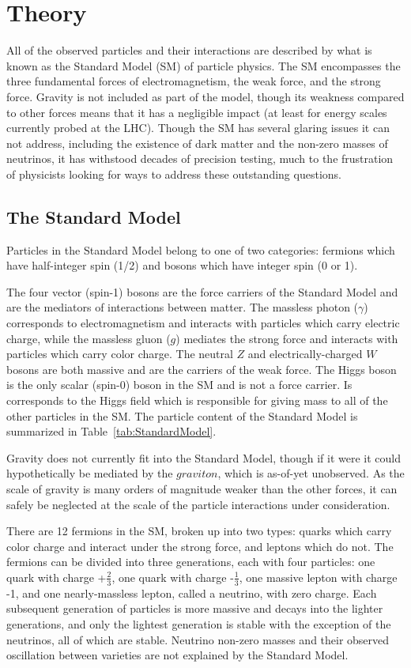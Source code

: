
\chapter{Theory}
\label{ch:Theory}

All of the observed particles and their interactions are described by what is known as the Standard Model (SM) of particle physics.  The SM encompasses the three fundamental forces of electromagnetism, the weak force, and the strong force.  Gravity is not included as part of the model, though its weakness compared to other forces means that it has a negligible impact (at least for energy scales currently probed at the LHC).  Though the SM has several glaring issues it can not address, including the existence of dark matter and the non-zero masses of neutrinos, it has withstood decades of precision testing, much to the frustration of physicists looking for ways to address these outstanding questions.

\section{The Standard Model}
Particles in the Standard Model belong to one of two categories: fermions which have half-integer spin (1/2) and bosons which have integer spin (0 or 1).

The four vector (spin-1) bosons are the force carriers of the Standard Model and are the mediators of interactions between matter.  The massless photon ($\gamma$) corresponds to electromagnetism and interacts with particles which carry electric charge, while the massless gluon ($g$) mediates the strong force and interacts with particles which carry color charge. The neutral $Z$ and electrically-charged $W$ bosons are both massive and are the carriers of the weak force.  The Higgs boson is the only scalar (spin-0) boson in the SM and is not a force carrier.  Is corresponds to the Higgs field which is responsible for giving mass to all of the other particles in the SM.  The particle content of the Standard Model is summarized in Table~\ref{tab:StandardModel}.

Gravity does not currently fit into the Standard Model, though if it were it could hypothetically be mediated by the $graviton$, which is as-of-yet unobserved.  As the scale of gravity is many orders of magnitude weaker than the other forces, it can safely be neglected at the scale of the particle interactions under consideration. 

There are 12 fermions in the SM, broken up into two types: quarks which carry color charge and interact under the strong force, and leptons which do not.  The fermions can be divided into three generations, each with four particles: one quark with charge +$\frac{2}{3}$, one quark with charge -$\frac{1}{3}$, one massive lepton with charge -1, and one nearly-massless lepton, called a neutrino,  with zero charge.  Each subsequent generation of particles is more massive and decays into the lighter generations, and only the lightest generation is stable with the exception of the neutrinos, all of which are stable.  Neutrino non-zero masses and their observed oscillation between varieties\cite{NeutrinoOscillation} are not explained by the Standard Model.

